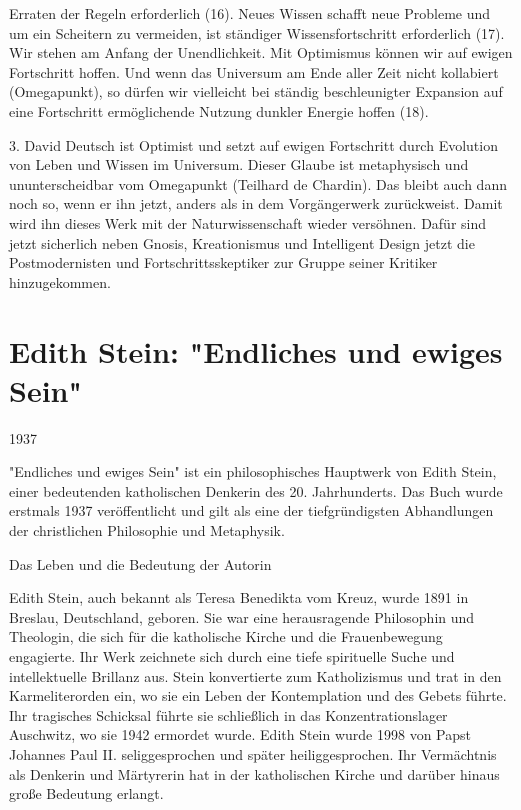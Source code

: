 \documentclass[
]{article}
\begin{document}
Erraten der Regeln erforderlich (16). Neues Wissen schafft neue Probleme und um ein Scheitern zu vermeiden, ist ständiger Wissensfortschritt erforderlich (17). Wir stehen am Anfang der Unendlichkeit. Mit Optimismus können wir auf ewigen Fortschritt hoffen. Und wenn das Universum am Ende aller Zeit nicht kollabiert (Omegapunkt), so dürfen wir vielleicht bei ständig beschleunigter Expansion auf eine Fortschritt ermöglichende Nutzung dunkler Energie hoffen (18).

3. David Deutsch ist Optimist und setzt auf ewigen Fortschritt durch Evolution von Leben und Wissen im Universum. Dieser Glaube ist metaphysisch und ununterscheidbar vom Omegapunkt (Teilhard de Chardin). Das bleibt auch dann noch so, wenn er ihn jetzt, anders als in dem Vorgängerwerk zurückweist. Damit wird ihn dieses Werk mit der Naturwissenschaft wieder versöhnen. Dafür sind jetzt sicherlich neben Gnosis, Kreationismus und Intelligent Design jetzt die Postmodernisten und Fortschrittsskeptiker zur Gruppe seiner Kritiker hinzugekommen.

\section{Edith Stein: "Endliches und ewiges Sein"}\label{edith-stein-endliches-und-ewiges-sein}

1937

"Endliches und ewiges Sein" ist ein philosophisches Hauptwerk von Edith Stein, einer bedeutenden katholischen Denkerin des 20. Jahrhunderts. Das Buch wurde erstmals 1937 veröffentlicht und gilt als eine der tiefgründigsten Abhandlungen der christlichen Philosophie und Metaphysik.

Das Leben und die Bedeutung der Autorin

Edith Stein, auch bekannt als Teresa Benedikta vom Kreuz, wurde 1891 in Breslau, Deutschland, geboren. Sie war eine herausragende Philosophin und Theologin, die sich für die katholische Kirche und die Frauenbewegung engagierte. Ihr Werk zeichnete sich durch eine tiefe spirituelle Suche und intellektuelle Brillanz aus. Stein konvertierte zum Katholizismus und trat in den Karmeliterorden ein, wo sie ein Leben der Kontemplation und des Gebets führte. Ihr tragisches Schicksal führte sie schließlich in das Konzentrationslager Auschwitz, wo sie 1942 ermordet wurde. Edith Stein wurde 1998 von Papst Johannes Paul II. seliggesprochen und später heiliggesprochen. Ihr Vermächtnis als Denkerin und Märtyrerin hat in der katholischen Kirche und darüber hinaus große Bedeutung erlangt.
\end{document}
